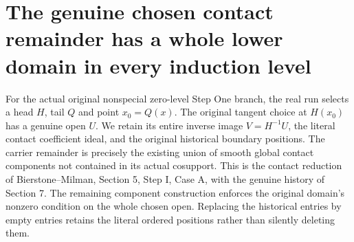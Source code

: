 \section{The genuine chosen contact remainder has a whole lower domain in every induction level}

For the actual original nonspecial zero-level Step One branch, the real run
selects a head $H$, tail $Q$ and point $x_0=Q(x)$. The original tangent choice
at $H(x_0)$ has a genuine open $U$. We retain its entire inverse image
$V=H^{-1}U$, the literal contact coefficient ideal, and the original historical
boundary positions. The carrier remainder is precisely the existing union of
smooth global contact components not contained in its actual cosupport.
This is the contact reduction of Bierstone--Milman\cite{bierstone-milman08-functoriality},
Section 5, Step I, Case A, with the genuine history of Section 7. The remaining
component construction enforces the original domain's nonzero condition on the
whole chosen open. Replacing the historical entries by empty entries retains
the literal ordered positions rather than silently deleting them.

